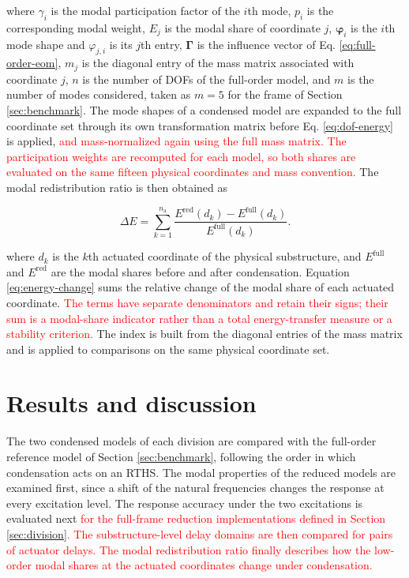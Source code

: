 \documentclass[a4paper,fleqn,review,12pt]{cas-sc}
\numberwithin{equation}{section}
\newcommand{\rev}[1]{\textcolor{red}{#1}}
\begin{document}
\noindent where \(\gamma_{i}\) is the modal participation factor of the \(i\)th mode, \(p_{i}\) is the corresponding modal weight, \(E_{j}\) is the modal share of coordinate \(j\), \(\bm{\varphi}_{i}\) is the \(i\)th mode shape and \(\varphi_{j,i}\) is its \(j\)th entry, \(\bm{\Gamma}\) is the influence vector of Eq. \eqref{eq:full-order-eom}, \(m_{j}\) is the diagonal entry of the mass matrix associated with coordinate \(j\), \(n\) is the number of DOFs of the full-order model, and \(m\) is the number of modes considered, taken as \(m=5\) for the frame of Section \ref{sec:benchmark}. The mode shapes of a condensed model are expanded to the full coordinate set through its own transformation matrix before Eq. \eqref{eq:dof-energy} is applied, \rev{and mass-normalized again using the full mass matrix. The participation weights are recomputed for each model, so both shares are evaluated on the same fifteen physical coordinates and mass convention.} The modal redistribution ratio is then obtained as

\vspace{-3.5em}
\begin{equation}
	\Delta E=\sum_{k=1}^{n_{\mathrm{a}}}
	\frac{E^{\mathrm{red}}(d_{k})-E^{\mathrm{full}}(d_{k})}{E^{\mathrm{full}}(d_{k})}.
	\label{eq:energy-change}
\end{equation}
\vspace{-3.5em}

\noindent where \(d_{k}\) is the \(k\)th actuated coordinate of the physical substructure, and \(E^{\mathrm{full}}\) and \(E^{\mathrm{red}}\) are the modal shares before and after condensation. Equation \eqref{eq:energy-change} sums the relative change of the modal share of each actuated coordinate. \rev{The terms have separate denominators and retain their signs; their sum is a modal-share indicator rather than a total energy-transfer measure or a stability criterion.} The index is built from the diagonal entries of the mass matrix and is applied to comparisons on the same physical coordinate set.




\section{Results and discussion} \label{sec5}

The two condensed models of each division are compared with the full-order reference model of Section \ref{sec:benchmark}, following the order in which condensation acts on an RTHS. The modal properties of the reduced models are examined first, since a shift of the natural frequencies changes the response at every excitation level. The response accuracy under the two excitations is evaluated next \rev{for the full-frame reduction implementations defined in Section \ref{sec:division}.} \rev{The substructure-level delay domains are then compared for pairs of actuator delays.} \rev{The modal redistribution ratio finally describes how the low-order modal shares at the actuated coordinates change under condensation.}
\end{document}
